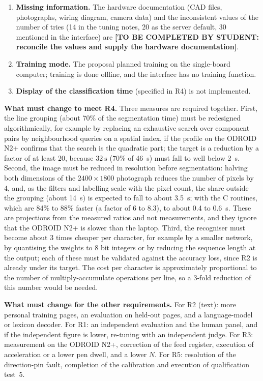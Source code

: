 \begin{enumerate}
          \item \textbf{Missing information.} The hardware documentation (CAD files, photographs, wiring diagram, camera data) and the inconsistent values of the number of tries (14 in the tuning notes, 20 as the server default, 30 mentioned in the interface) are \textbf{[TO BE COMPLETED BY STUDENT: reconcile the values and supply the hardware documentation]}.
          \item \textbf{Training mode.} The proposal planned training on the single-board computer; training is done offline, and the interface has no training function.
          \item \textbf{Display of the classification time} (specified in R4) is not implemented.
        \end{enumerate}

        \textbf{What must change to meet R4.}
        Three measures are required together.
        First, the line grouping (about 70\% of the segmentation time) must be redesigned algorithmically, for example by replacing an exhaustive search over component pairs by neighbourhood queries on a spatial index, if the profile on the ODROID N2+ confirms that the search is the quadratic part; the target is a reduction by a factor of at least 20, because $32~\mathrm{s}$ (70\% of 46~s) must fall to well below 2~s.
        Second, the image must be reduced in resolution before segmentation: halving both dimensions of the $2400\times1800$ photograph reduces the number of pixels by 4, and, as the filters and labelling scale with the pixel count, the share outside the grouping (about 14~s) is expected to fall to about 3.5~s; with the C routines, which are 84\% to 88\% faster (a factor of 6 to 8.3), to about 0.4 to 0.6~s.
        These are projections from the measured ratios and not measurements, and they ignore that the ODROID N2+ is slower than the laptop.
        Third, the recogniser must become about 3 times cheaper per character, for example by a smaller network, by quantising the weights to 8 bit integers or by reducing the sequence length at the output; each of these must be validated against the accuracy loss, since R2 is already under its target.
        The cost per character is approximately proportional to the number of multiply-accumulate operations per line, so a 3-fold reduction of this number would be needed.

        \textbf{What must change for the other requirements.}
        For R2 (text): more personal training pages, an evaluation on held-out pages, and a language-model or lexicon decoder.
        For R1: an independent evaluation and the human panel, and if the independent figure is lower, re-tuning with an independent judge.
        For R3: measurement on the ODROID N2+, correction of the feed register, execution of acceleration or a lower pen dwell, and a lower $N$.
        For R5: resolution of the direction-pin fault, completion of the calibration and execution of qualification test~5.

